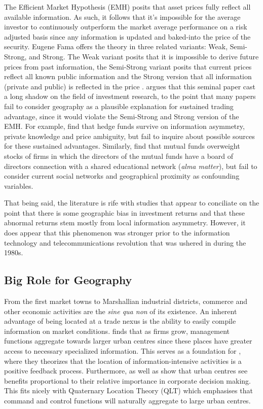 The Efficient Market Hypothesis (EMH) \citep{Fama1970,Fama1991} posits that asset prices fully reflect all available information.  As such, it follows that it's impossible for the average investor to continuously outperform the market average performance on a risk adjusted basis since any information is updated and baked-into the price of the security. Eugene Fama offers the theory in three related variants: Weak, Semi-Strong, and Strong. The Weak variant posits that it is impossible to derive future prices from past information, the Semi-Strong variant posits that current prices reflect all known public information and the Strong version that all information (private and public) is reflected in the price \citep{Fama1970}.  \cite{Graves2003} argues that this seminal paper cast a long shadow on the field of investment research, to the point that many papers fail to consider geography as a plausible explanation for sustained trading advantage, since it would violate the Semi-Strong and Strong version of the EMH. For example, \cite{Easley2011} find that hedge funds survive on information asymmetry, private knowledge and price ambiguity, but fail to inquire about possible sources for these sustained advantages.  Similarly, \cite{Cohen2008} find that mutual funds overweight stocks of firms in which the directors of the mutual funds have a board of directors connection with a shared educational network (\textit{alma matter}), but fail to consider current social networks and geographical proximity as confounding variables.	
	
That being said, the literature is rife with studies that appear to conciliate on the point that there is some geographic bias in investment returns and that these abnormal returns stem mostly from local information asymmetry. However, it does appear that this phenomenon was stronger prior to the information technology and telecommunications revolution that was ushered in during the 1980s.  
	
\subsection{Big Role for Geography} 
	
From the first market towns to Marshallian industrial districts, commerce and other economic activities are the \textit{sine qua non} of its existence. An inherent advantage of being located at a trade nexus is the ability to easily compile information on market conditions. \cite{Westaway1974} finds that as firms grow, management functions aggregate towards larger urban centres since these places have greater access to necessary specialized information.  This serves as a foundation for \cite{pred1977}, where they theorizes that the location of information-intensive activities is a positive feedback process. Furthermore, \cite{JAMES1988} as well as \cite{WheelerMitchelson89,Wheeler1989} show that urban centres see benefits proportional to their relative importance in corporate decision making.  This fits nicely with Quaternary Location Theory (QLT)\citep{Semple85} which emphasises that command and control functions will naturally aggregate to large urban centres.
	
